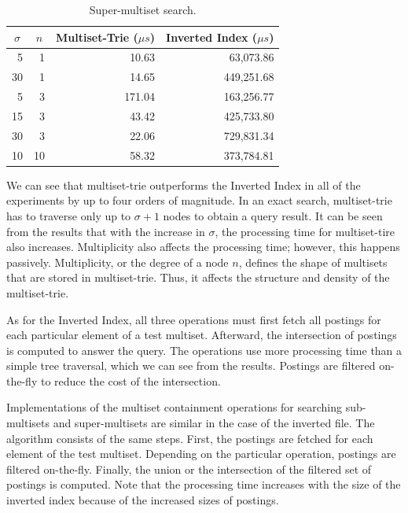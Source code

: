 \documentclass[algorithms,article,accept,pdftex,moreauthors]{Definitions/mdpi}
\begin{document}
\begin{table}[H]
\caption{Super-multiset search.}
\label{t:res_sup}
\begin{tabularx}{\textwidth}{rrrr}
\toprule
\multicolumn{1}{c}{\boldmath$\sigma$} & 
\multicolumn{1}{c}{\boldmath$n$} & 
\multicolumn{1}{c}{\textbf{Multiset-Trie (\boldmath$\mu s$)}} & 
\multicolumn{1}{c}{\textbf{Inverted Index (\boldmath$\mu s$)}} \\
\midrule
5		& 1 		& 10.63 & 63,073.86\\
30	& 1 		& 14.65 & 449,251.68\\
5		& 3 		& 171.04 & 163,256.77\\
15	& 3 		& 43.42 & 425,733.80\\
30	& 3 		& 22.06 & 729,831.34\\
10	& 10 	& 58.32 & 373,784.81\\
\bottomrule
\end{tabularx}
\end{table}

We can see that multiset-trie outperforms the Inverted Index in all of the
experiments by up to four orders of magnitude. In an exact search,
multiset-trie has to traverse only up to $\sigma+1$ nodes to obtain a query
result. It can be seen from the results that with the increase in $\sigma$,
the processing time for multiset-tire also increases. Multiplicity
also affects the processing time; however, this happens
passively. Multiplicity, or the degree of a node $n$, defines the shape of
multisets that are stored in multiset-trie. Thus, it affects the
structure and density of the multiset-trie.

As for the Inverted Index, all three operations must first fetch all
postings for each particular element of a test multiset. Afterward,
the intersection of postings is computed to answer the query. The
operations use more processing time than a simple tree traversal,
which we can see from the results. Postings are filtered on-the-fly to
reduce the cost of the intersection.

Implementations of the multiset containment operations
for searching sub-multisets and super-multisets are similar in
the case of the inverted file. The algorithm consists of the same
steps. First, the postings are fetched for each element of the test
multiset. Depending on the particular operation, postings are filtered
on-the-fly. Finally, the union or the intersection of the filtered set
of postings is computed. Note that the processing time increases with
the size of the inverted index because of the increased sizes of
postings.
\end{document}
